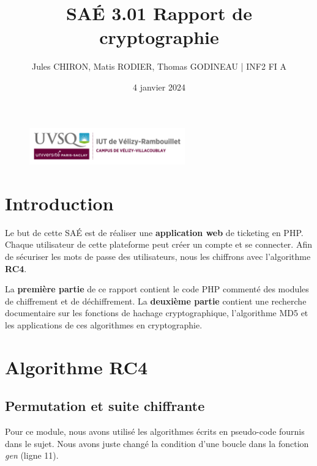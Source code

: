 \documentclass[12pt, a4paper]{article}
\title{SAÉ 3.01 Rapport de cryptographie}
\author{Jules CHIRON, Matis RODIER, Thomas GODINEAU | INF2 FI A}
\date{4 janvier 2024}
\begin{document}
\maketitle

\begin{figure}[h]
    \includegraphics[width=0.6\textwidth]{../annexes/logo_uvsq}
\end{figure}

\tableofcontents{}
\section*{Introduction}

Le but de cette SAÉ est de réaliser une \textbf{application web} de ticketing en PHP.\@
Chaque utilisateur de cette plateforme peut créer un compte et se connecter.
Afin de sécuriser les mots de passe des utilisateurs, nous les chiffrons avec l'algorithme \textbf{RC4}.
\bigskip

La \textbf{première partie} de ce rapport contient le code PHP commenté des modules de chiffrement et de déchiffrement.
La \textbf{deuxième partie} contient une recherche documentaire sur les fonctions de hachage cryptographique,
l'algorithme MD5 et les applications de ces algorithmes en cryptographie.

\section{Algorithme RC4}

\subsection{Permutation et suite chiffrante}

Pour ce module,
nous avons utilisé les algorithmes écrits en pseudo-code fournis dans le sujet.
Nous avons juste changé la condition d'une boucle dans la fonction \textit{gen} (ligne 11).

\end{document}
